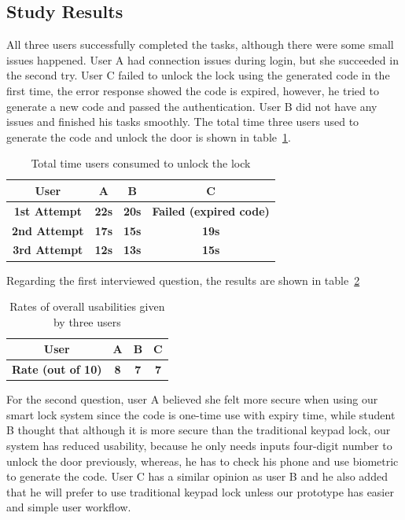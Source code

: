 \documentclass[conference]{IEEEtran}
\begin{document}
\subsection{Study Results}
All three users successfully completed the tasks, although there were some small issues happened. User A had connection issues during login, but she succeeded in the second try. User C failed to unlock the lock using the generated code in the first time, the error response showed the code is expired, however, he tried to generate a new code and passed the authentication. User B did not have any issues and finished his tasks smoothly. The total time three users used to generate the code and unlock the door is shown in table~\ref{tab:time}.

\begin{table}[htbp]
\caption{Total time users consumed to unlock the lock}
\begin{center}
\begin{tabular}{|c|c|c|c|}
\hline
\textbf{User}&\textbf{A}&\textbf{B}&\textbf{C} \\
\hline
\textbf{1st Attempt} & \textbf{22s} & \textbf{20s} & \textbf{Failed (expired code)} \\
\hline
\textbf{2nd Attempt} & \textbf{17s} & \textbf{15s} & \textbf{19s} \\
\hline
\textbf{3rd Attempt} & \textbf{12s} & \textbf{13s} & \textbf{15s}  \\
\hline
\end{tabular}
\label{tab:time}
\end{center}
\end{table}
Regarding the first interviewed question, the results are shown in table~\ref{tab:rate}

\begin{table}[htbp]
\caption{Rates of overall usabilities given by three users}
\begin{center}
\begin{tabular}{|c|c|c|c|}
\hline
\textbf{User}&\textbf{A}&\textbf{B}&\textbf{C} \\
\hline
\textbf{Rate (out of 10)} & \textbf{8} & \textbf{7} & \textbf{7} \\
\hline
\end{tabular}
\label{tab:rate}
\end{center}
\end{table}
For the second question, user A believed she felt more secure when using our smart lock system since the code is one-time use with expiry time, while student B thought that although it is more secure than the traditional keypad lock, our system has reduced usability, because he only needs inputs four-digit number to unlock the door previously, whereas, he has to check his phone and use biometric to generate the code. User C has a similar opinion as user B and he also added that he will prefer to use traditional keypad lock unless our prototype has easier and simple user workflow.
\end{document}
